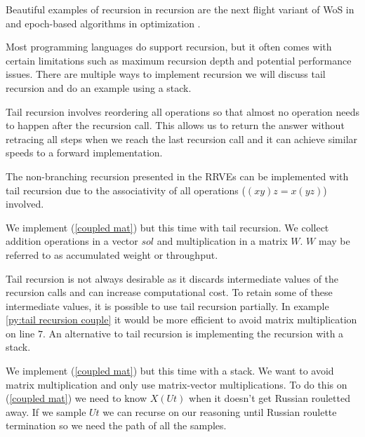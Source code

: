 \documentclass[a4paper,12pt]{article}
\begin{document}
\begin{related}
    Beautiful examples of recursion in recursion are
    the next flight variant of WoS in
    \cite{sawhney_grid-free_2022} and epoch-based algorithms in optimization
    \cite{gupta_convergence_2021}.
\end{related}

Most programming languages do support recursion, but it often comes with certain
limitations such as maximum recursion depth and potential performance issues.
There are multiple ways to implement recursion we will discuss tail recursion and
do an example using a stack.

\begin{technique}
    Tail recursion involves reordering all operations
    so that almost no operation needs to happen after
    the recursion call. This allows us to return the
    answer without retracing all steps when we reach
    the last recursion call and it can achieve similar
    speeds to a forward implementation.
\end{technique}

The non-branching recursion presented in the RRVEs
can be implemented with tail recursion due to the associativity of
all operations ($(xy)z = x(yz)$) involved.

\begin{pythonn} \label{py:tail recursion couple}
    We implement (\ref{coupled mat}) but this time with tail recursion.
    We collect addition operations in a vector $sol$ and multiplication
    in a matrix $W$. $W$ may be referred to as accumulated weight or throughput.
    \vspace{0.3cm}
\end{pythonn}

Tail recursion is not always desirable as it discards intermediate values of
the recursion calls and can increase
computational cost.
To retain some of these intermediate values, it is possible to use tail recursion partially.
In example \ref{py:tail recursion couple} it would
be more efficient to avoid matrix multiplication on line $7$. An alternative
to tail recursion is implementing the recursion with a stack.

\begin{pythonn} \label{py:stack recursion couple}
    We implement (\ref{coupled mat}) but this time with a stack.
    We want to avoid matrix multiplication and only use matrix-vector multiplications.
    To do this on (\ref{coupled mat}) we need to know $X(Ut)$ when
    it doesn't get Russian rouletted away. If we sample $Ut$ we can recurse
    on our reasoning until Russian roulette termination so we need the path
    of all the samples.
    \vspace{0.3cm}
\end{pythonn}
\end{document}
